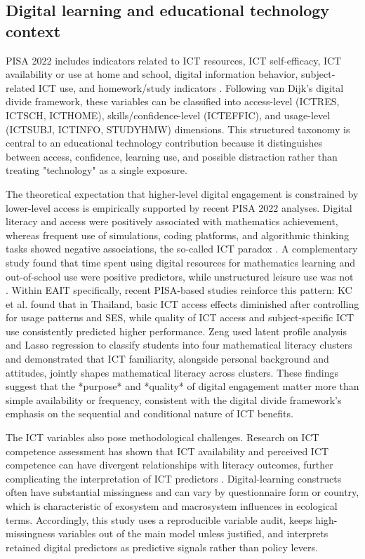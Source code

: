 \documentclass[pdflatex,sn-mathphys-ay]{sn-jnl}
\begin{document}
\FloatBarrier
\subsection{Digital learning and educational technology context}

PISA 2022 includes indicators related to ICT resources, ICT self-efficacy, ICT availability or use at home and school, digital information behavior, subject-related ICT use, and homework/study indicators \citep{OECD_2022_results_vol2}. Following van Dijk's digital divide framework, these variables can be classified into access-level (ICTRES, ICTSCH, ICTHOME), skills/confidence-level (ICTEFFIC), and usage-level (ICTSUBJ, ICTINFO, STUDYHMW) dimensions. This structured taxonomy is central to an educational technology contribution because it distinguishes between access, confidence, learning use, and possible distraction rather than treating "technology" as a single exposure.

The theoretical expectation that higher-level digital engagement is constrained by lower-level access \citep{van_Dijk_2020} is empirically supported by recent PISA 2022 analyses. Digital literacy and access were positively associated with mathematics achievement, whereas frequent use of simulations, coding platforms, and algorithmic thinking tasks showed negative associations, the so-called ICT paradox \citep{Joshi_2025_digital_literacy}. A complementary study found that time spent using digital resources for mathematics learning and out-of-school use were positive predictors, while unstructured leisure use was not \citep{Joshi_2025_digital_resources}. Within EAIT specifically, recent PISA-based studies reinforce this pattern: KC et al. \citep{KC_2025_digital_inequality} found that in Thailand, basic ICT access effects diminished after controlling for usage patterns and SES, while quality of ICT access and subject-specific ICT use consistently predicted higher performance. Zeng \citep{Zeng_2024} used latent profile analysis and Lasso regression to classify students into four mathematical literacy clusters and demonstrated that ICT familiarity, alongside personal background and attitudes, jointly shapes mathematical literacy across clusters. These findings suggest that the *purpose* and *quality* of digital engagement matter more than simple availability or frequency, consistent with the digital divide framework's emphasis on the sequential and conditional nature of ICT benefits.

The ICT variables also pose methodological challenges. Research on ICT competence assessment has shown that ICT availability and perceived ICT competence can have divergent relationships with literacy outcomes, further complicating the interpretation of ICT predictors \citep{Acun_Celik_2024}. Digital-learning constructs often have substantial missingness and can vary by questionnaire form or country, which is characteristic of exosystem and macrosystem influences in ecological terms. Accordingly, this study uses a reproducible variable audit, keeps high-missingness variables out of the main model unless justified, and interprets retained digital predictors as predictive signals rather than policy levers.
\end{document}
